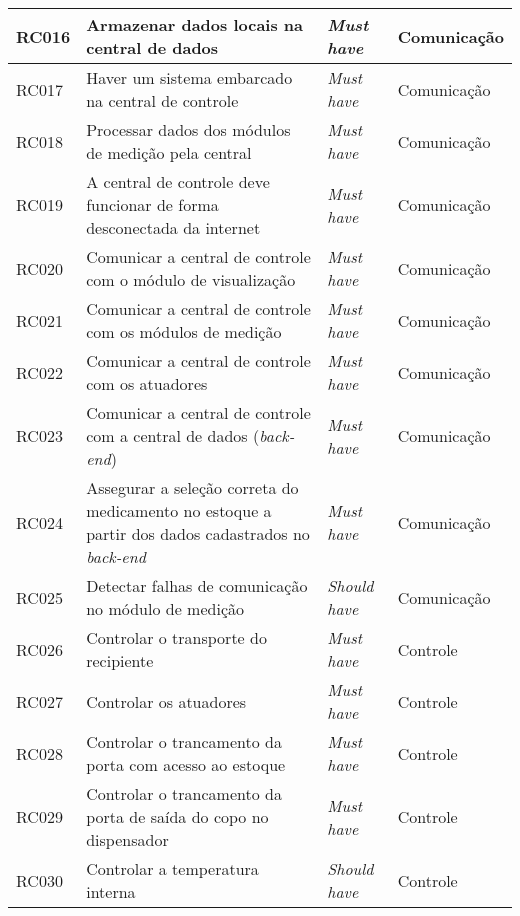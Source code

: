 \begin{table}[H]
\begin{adjustbox}{max width = \textwidth}
\begin{tabular}{|L{1.5cm}|L{8.5cm}|C{2.5cm}|C{3.5cm}|}
        RC016 & Armazenar dados locais na central de dados & \textit{Must have} & Comunicação\\ \hline
        RC017 & Haver um sistema embarcado na central de controle & \textit{Must have} & Comunicação\\ \hline
        RC018 & Processar dados dos módulos de medição  pela central & \textit{Must have} & Comunicação\\ \hline
        RC019 & A central de controle deve funcionar de forma desconectada da internet & \textit{Must have} & Comunicação\\ \hline
        RC020 & Comunicar a central de controle  com o módulo de visualização & \textit{Must have} & Comunicação\\ \hline
        RC021 & Comunicar a central de controle com os módulos de medição & \textit{Must have} & Comunicação\\ \hline
        RC022 & Comunicar a central de controle com os atuadores & \textit{Must have} & Comunicação\\ \hline
        RC023 & Comunicar a  central de controle com a central de dados (\textit{back-end}) & \textit{Must have} & Comunicação\\ \hline
        RC024 & Assegurar a seleção correta do medicamento no estoque a partir dos dados cadastrados no \textit{back-end} & \textit{Must have} & Comunicação\\ \hline
        RC025 & Detectar falhas de comunicação no módulo de medição & \textit{Should have} & Comunicação\\ \hline
        RC026 & Controlar o transporte do recipiente & \textit{Must have} & Controle \\ \hline
        RC027 & Controlar os atuadores & \textit{Must have} & Controle \\ \hline
        RC028 & Controlar o trancamento da porta com acesso ao estoque & \textit{Must have} & Controle \\ \hline
        RC029 & Controlar o trancamento da porta de saída do copo no dispensador & \textit{Must have} & Controle \\ \hline
        RC030 & Controlar a temperatura interna & \textit{Should have} & Controle \\ \hline
        \end{tabular}
	\end{adjustbox}
\end{table}


